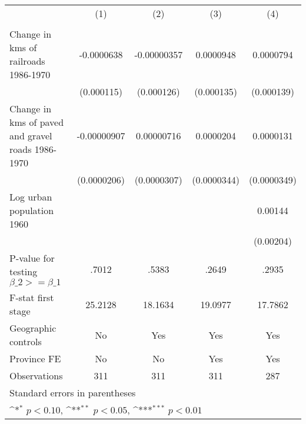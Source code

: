 {
\def\sym#1{\ifmmode^{#1}\else\(^{#1}\)\fi}
\begin{tabular}{l*{4}{c}}
\hline\hline
                &\multicolumn{1}{c}{(1)}&\multicolumn{1}{c}{(2)}&\multicolumn{1}{c}{(3)}&\multicolumn{1}{c}{(4)}\\
                &\multicolumn{1}{c}{}&\multicolumn{1}{c}{}&\multicolumn{1}{c}{}&\multicolumn{1}{c}{}\\
\hline
Change in kms of railroads 1986-1970&-0.0000638         &-0.00000357         &0.0000948         &0.0000794         \\
                &(0.000115)         &(0.000126)         &(0.000135)         &(0.000139)         \\
[1em]
Change in kms of paved and gravel roads 1986-1970&-0.00000907         &0.00000716         &0.0000204         &0.0000131         \\
                &(0.0000206)         &(0.0000307)         &(0.0000344)         &(0.0000349)         \\
[1em]
Log urban population 1960&                  &                  &                  &  0.00144         \\
                &                  &                  &                  &(0.00204)         \\
\hline
P-value for testing $\beta\_{2} >= \beta\_{1}$&    .7012         &    .5383         &    .2649         &    .2935         \\
F-stat first stage&  25.2128         &  18.1634         &  19.0977         &  17.7862         \\
Geographic controls&       No         &      Yes         &      Yes         &      Yes         \\
Province FE     &       No         &       No         &      Yes         &      Yes         \\
Observations    &      311         &      311         &      311         &      287         \\
\hline\hline
\multicolumn{5}{l}{\footnotesize Standard errors in parentheses}\\
\multicolumn{5}{l}{\footnotesize \sym{*} \(p<0.10\), \sym{**} \(p<0.05\), \sym{***} \(p<0.01\)}\\
\end{tabular}
}
